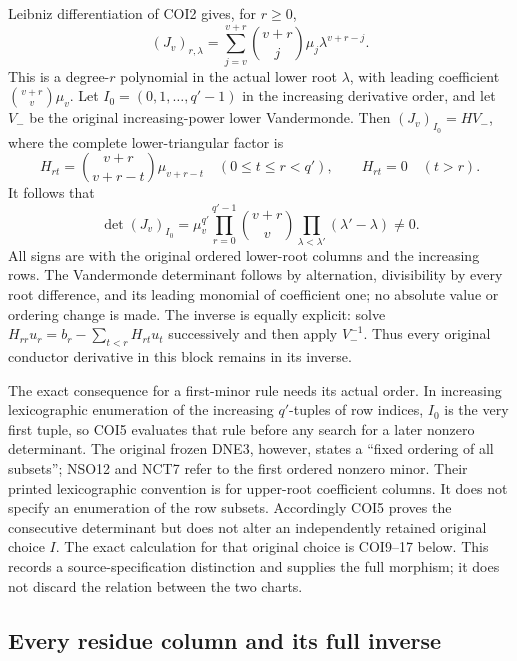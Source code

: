 Leibniz differentiation of COI2 gives, for $r\ge0$,
\[
 (J_v)_{r,\lambda}
       =\sum_{j=v}^{v+r}\binom{v+r}{j}\mu_j\lambda^{v+r-j}.
 \tag{COI3}
\]
This is a degree-$r$ polynomial in the actual lower root $\lambda$,
with leading coefficient $\binom{v+r}{v}\mu_v$.
Let $I_0=(0,1,\ldots,q'-1)$ in the increasing derivative order,
and let $V_-$ be the original increasing-power lower Vandermonde.
Then $(J_v)_{I_0}=HV_-$, where the complete lower-triangular factor is
\[
 H_{rt}=\binom{v+r}{v+r-t}\mu_{v+r-t}\quad(0\le t\le r<q'),
 \qquad H_{rt}=0\quad(t>r).
 \tag{COI4}
\]
It follows that
\[
 \det(J_v)_{I_0}
  =\mu_v^{q'}\prod_{r=0}^{q'-1}\binom{v+r}{v}
       \prod_{\lambda<\lambda'}(\lambda'-\lambda)\ne0.
 \tag{COI5}
\]
All signs are with the original ordered lower-root columns and the
increasing rows. The Vandermonde determinant follows by alternation,
divisibility by every root difference, and its leading monomial of
coefficient one; no absolute value or ordering change is made.
The inverse is equally explicit: solve
$H_{rr}u_r=b_r-\sum_{t<r}H_{rt}u_t$ successively and then
apply $V_-^{-1}$. Thus every original conductor derivative in this
block remains in its inverse.

The exact consequence for a first-minor rule needs its actual order.
In increasing lexicographic enumeration of the increasing $q'$-tuples
of row indices, $I_0$ is the very first tuple, so COI5 evaluates that
rule before any search for a later nonzero determinant.
The original frozen DNE3, however, states a ``fixed ordering of all
subsets''; NSO12 and NCT7 refer to the first ordered nonzero minor.
Their printed lexicographic convention is for upper-root coefficient
columns. It does not specify an enumeration of the row subsets.
Accordingly COI5 proves the consecutive determinant but does not
alter an independently retained original choice $I$.
The exact calculation for that original choice is COI9--17 below.
This records a source-specification distinction and supplies the full
morphism; it does not discard the relation between the two charts.

\subsection{Every residue column and its full inverse}

